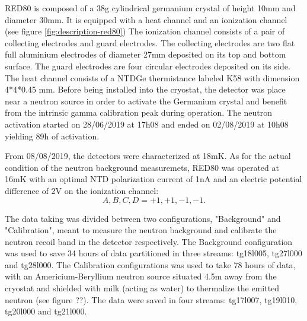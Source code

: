 RED80 is composed of a 38g cylindrical germanium crystal of height 10mm and diameter 30mm.
It is equipped with a heat channel and an ionization channel (see figure \ref{fig:description-red80})
The ionization channel consists of a pair of collecting electrodes and guard electrodes.
The collecting electrodes are two flat full aluminium electrodes of diameter 27mm deposited on its top and bottom surface.
The guard electrodes are four circular electrodes deposited on its side.
The heat channel consists of a NTDGe thermistance labeled K58 with dimension 4*4*0.45 mm.
Before being installed into the cryostat, the detector was place near a neutron source in order to activate the Germanium crystal and benefit from the intrinsic gamma calibration peak during operation. The neutron activation started on 28/06/2019 at 17h08 and ended on 02/08/2019 at 10h08 yielding 89h of activation.

From 08/08/2019, the detectors were characterized at 18mK. As for the actual condition of the neutron background measuremets, RED80 was operated at 16mK with an optimal NTD polarization current of 1nA and an electric potential difference of 2V on the ionization channel:
$$ A, B, C, D = +1, +1, -1, -1.$$

The data taking was divided between two configurations, "Background" and "Calibration", meant to measure the neutron background and calibrate the neutron recoil band in the detector respectively.
The Background configuration was used to save 34 hours of data partitioned in three streams: tg18l005, tg27l000 and tg28l000.
The Calibration configurations was used to take 78 hours of data, with an Americium-Beryllium neutron source situated 4.5m away from the cryostat and shielded with milk (acting as water) to thermalize the emitted neutron (see figure ??). The data were saved in four streams: tg17l007, tg19l010, tg20l000 and tg21l000.

